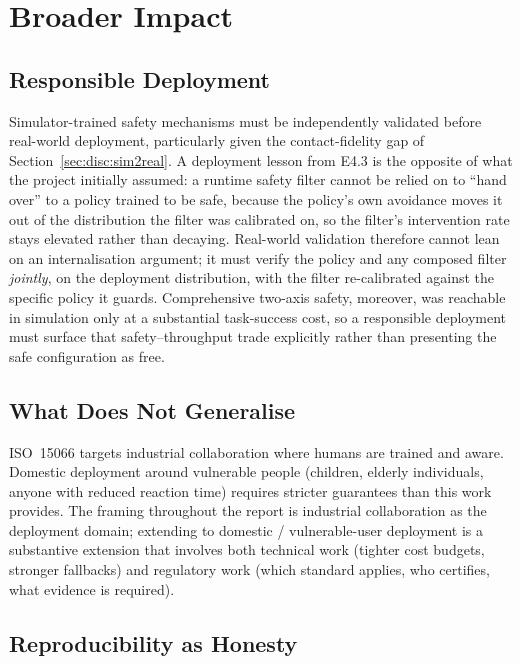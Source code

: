 \documentclass[11pt,a4paper]{report}
\newcommand{\iso}{ISO~15066}
\begin{document}
\section{Broader Impact}
\label{sec:disc:broader}

\subsection{Responsible Deployment}

Simulator-trained safety mechanisms must be independently validated
before real-world deployment, particularly given the contact-fidelity
gap of Section~\ref{sec:disc:sim2real}. A deployment lesson from E4.3
is the opposite of what the project initially assumed: a runtime
safety filter cannot be relied on to ``hand over'' to a policy trained
to be safe, because the policy's own avoidance moves it out of the
distribution the filter was calibrated on, so the filter's
intervention rate stays elevated rather than decaying. Real-world
validation therefore cannot lean on an internalisation argument; it
must verify the policy and any composed filter \emph{jointly}, on the
deployment distribution, with the filter re-calibrated against the
specific policy it guards. Comprehensive two-axis safety, moreover,
was reachable in simulation only at a substantial task-success cost,
so a responsible deployment must surface that safety--throughput trade
explicitly rather than presenting the safe configuration as free.

\subsection{What Does Not Generalise}

\iso{} targets industrial collaboration where humans are trained
and aware. Domestic deployment around vulnerable people (children, elderly individuals, anyone with
reduced reaction time) requires stricter guarantees than this work provides. The
framing throughout the report is industrial collaboration as the
deployment domain; extending to domestic / vulnerable-user
deployment is a substantive extension that involves both technical
work (tighter cost budgets, stronger fallbacks) and regulatory work
(which standard applies, who certifies, what evidence is required).

\subsection{Reproducibility as Honesty}
\end{document}
